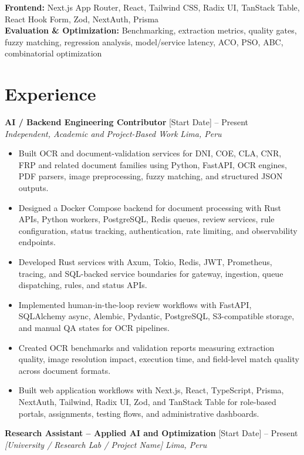 \documentclass[10pt,letterpaper]{article}
\newcommand{\resumeSubheading}[4]{
  \textbf{#1} \hfill #2 \\
  \textit{#3} \hfill \textit{#4}
}
\begin{document}
\textbf{Frontend:} Next.js App Router, React, Tailwind CSS, Radix UI, TanStack Table, React Hook Form, Zod, NextAuth, Prisma \\

\textbf{Evaluation \& Optimization:} Benchmarking, extraction metrics, quality gates, fuzzy matching, regression analysis, model/service latency, ACO, PSO, ABC, combinatorial optimization


\section{Experience}

\resumeSubheading
{AI / Backend Engineering Contributor}
{[Start Date] -- Present}
{Independent, Academic and Project-Based Work}
{Lima, Peru}

\begin{itemize}
    \item Built OCR and document-validation services for DNI, COE, CLA, CNR, FRP and related document families using Python, FastAPI, OCR engines, PDF parsers, image preprocessing, fuzzy matching, and structured JSON outputs.
    \item Designed a Docker Compose backend for document processing with Rust APIs, Python workers, PostgreSQL, Redis queues, review services, rule configuration, status tracking, authentication, rate limiting, and observability endpoints.
    \item Developed Rust services with Axum, Tokio, Redis, JWT, Prometheus, tracing, and SQL-backed service boundaries for gateway, ingestion, queue dispatching, rules, and status APIs.
    \item Implemented human-in-the-loop review workflows with FastAPI, SQLAlchemy async, Alembic, Pydantic, PostgreSQL, S3-compatible storage, and manual QA states for OCR pipelines.
    \item Created OCR benchmarks and validation reports measuring extraction quality, image resolution impact, execution time, and field-level match quality across document formats.
    \item Built web application workflows with Next.js, React, TypeScript, Prisma, NextAuth, Tailwind, Radix UI, Zod, and TanStack Table for role-based portals, assignments, testing flows, and administrative dashboards.
\end{itemize}

\resumeSubheading
{Research Assistant -- Applied AI and Optimization}
{[Start Date] -- Present}
{[University / Research Lab / Project Name]}
{Lima, Peru}
\end{document}
